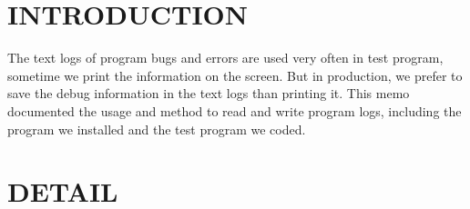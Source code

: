 \newcommand{\WorkWeek}{1324} %
\newcommand{\BossName}{Arden Chang} %
\newcommand{\BossInitials}{ARDN} %
\newcommand{\Author}{Qiling Bo} %
\newcommand{\AuthorInitials}{QIBO} %
\newcommand{\MemoNumber}{115} %
\newcommand{\Subject}{PROGRAM LOGS} %
\newcommand{\Category}{Test Development} %
\newcommand{\Distribution}{PZHO, MZFA, WEIQ, ARDN, RQB, BMOCHINA} %





\maketitle

\section{INTRODUCTION}
The text logs of program bugs and errors are used very often in test program, sometime we print the information on the screen.
But in production, we prefer to save the debug information in the text logs than printing it.
This memo documented the usage and method to read and write program logs, including the program we installed and the test program we coded.

\section{DETAIL}
